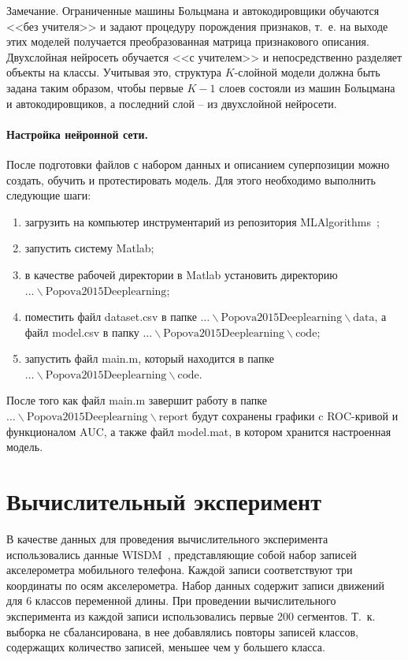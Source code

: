 \documentclass[12pt,notitlepage]{article}
\begin{document}
Замечание. Ограниченные машины Больцмана и автокодировщики обучаются <<без учителя>> и задают процедуру порождения признаков, т.~е. на выходе этих моделей получается преобразованная матрица признакового описания. Двухслойная нейросеть обучается <<с учителем>> и непосредственно разделяет объекты на классы. Учитывая это, структура $K$-слойной модели должна быть задана таким образом, чтобы первые $K-1$ слоев состояли из машин Больцмана и автокодировщиков, а последний слой -- из двухслойной нейросети.

\paragraph{Настройка нейронной сети.} После подготовки файлов с набором данных и описанием суперпозиции можно создать, обучить и протестировать модель. Для этого необходимо выполнить следующие шаги:
\begin{enumerate}[1)]
\item загрузить на компьютер инструментарий из репозитория MLAlgorithms~\cite{source_popova};
\item запустить систему Matlab;
\item в качестве рабочей директории в Matlab установить директорию \\$\dots\backslash \text{Popova2015Deeplearning}$;
\item поместить файл dataset.csv в папке $\dots\backslash \text{Popova2015Deeplearning}\backslash \text{data}$, а файл model.csv в папку $\dots\backslash \text{Popova2015Deeplearning}\backslash \text{code}$;
\item запустить файл main.m, который находится в папке $\dots\backslash \text{Popova2015Deeplearning}\backslash \text{code}$.

\end{enumerate}

После того как файл main.m завершит работу в папке $\dots\backslash \text{Popova2015Deeplearning}\backslash \text{report}$ будут сохранены графики c ROC-кривой и функционалом AUC, а также файл model.mat, в котором хранится настроенная модель.


\section{Вычислительный эксперимент}
В качестве данных для проведения вычислительного эксперимента использовались данные WISDM~\cite{wisdm}, представляющие собой набор записей акселерометра мобильного телефона. Каждой записи соответствуют три координаты по осям акселерометра. Набор данных содержит записи движений для 6 классов переменной длины.
При проведении вычислительного эксперимента из каждой записи использовались первые 200 сегментов. Т.~к. выборка не сбалансирована, в нее добавлялись повторы записей классов, содержащих количество записей, меньшее чем у большего класса.
\end{document}
